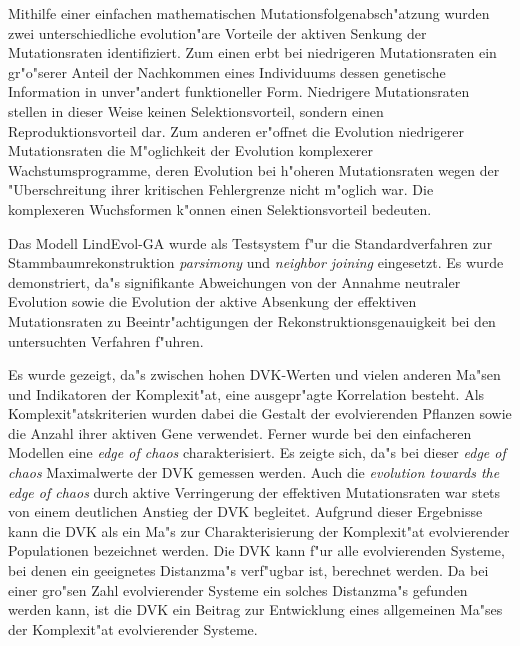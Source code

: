 Mithilfe einer einfachen mathematischen Mutationsfolgenabsch"atzung wurden zwei unterschiedliche evolution"are
Vorteile der aktiven Senkung der Mutationsraten identifiziert. Zum einen erbt bei niedrigeren Mutationsraten ein
gr"o"serer Anteil der Nachkommen eines Individuums dessen genetische Information in unver"andert funktioneller
Form. Niedrigere Mutationsraten stellen in dieser Weise keinen Selektionsvorteil, sondern einen
Reproduktionsvorteil dar. Zum anderen er"offnet die Evolution niedrigerer Mutationsraten die M"oglichkeit
der Evolution komplexerer Wachstumsprogramme, deren Evolution bei h"oheren Mutationsraten wegen der "Uberschreitung
ihrer kritischen Fehlergrenze \cite{Maynard89} nicht m"oglich war. Die komplexeren Wuchsformen k"onnen einen
Selektionsvorteil bedeuten.

Das Modell LindEvol-GA wurde als Testsystem f"ur die Standardverfahren zur Stammbaumrekonstruktion
\textsl{parsimony} und \textsl{neighbor joining} \cite{PHYLIP} eingesetzt. Es wurde demonstriert, da"s signifikante
Abweichungen von der Annahme neutraler Evolution sowie die Evolution der aktive Absenkung der
effektiven Mutationsraten zu Beeintr"achtigungen der Rekonstruktionsgenauigkeit bei den untersuchten
Verfahren f"uhren.

Es wurde gezeigt, da"s zwischen hohen DVK-Werten und vielen anderen Ma"sen und Indikatoren
der Komplexit"at, eine ausgepr"agte Korrelation besteht. Als Komplexit"atskriterien wurden
dabei die Gestalt der evolvierenden Pflanzen sowie die Anzahl ihrer aktiven Gene verwendet.
Ferner wurde bei den einfacheren Modellen eine \textsl{edge of chaos} \cite{Kauffman92,Langton92} charakterisiert. Es
zeigte sich, da"s bei dieser \textsl{edge of chaos} Maximalwerte der DVK gemessen werden.
Auch die \textsl{evolution towards the edge of chaos} durch aktive Verringerung der effektiven
Mutationsraten war stets von einem deutlichen Anstieg der DVK begleitet. Aufgrund dieser
Ergebnisse kann die DVK als ein Ma"s zur Charakterisierung der Komplexit"at evolvierender
Populationen bezeichnet werden. Die DVK kann f"ur alle evolvierenden Systeme, bei denen ein geeignetes Distanzma"s
verf"ugbar ist, berechnet werden. Da bei einer gro"sen Zahl evolvierender Systeme ein solches
Distanzma"s gefunden werden kann, ist die DVK ein Beitrag zur Entwicklung eines allgemeinen Ma"ses
der Komplexit"at evolvierender Systeme.

